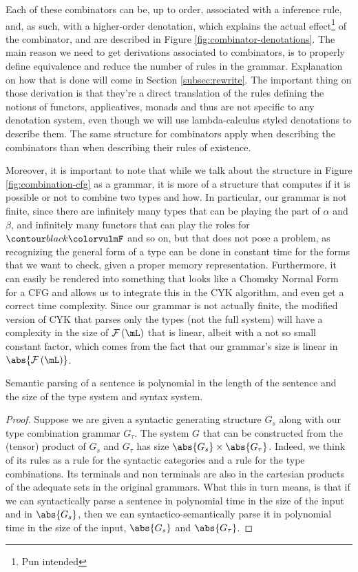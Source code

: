 Each of these combinators can be, up to order, associated with a inference
rule, and, as such, with a higher-order denotation, which explains the actual
effect\footnote{Pun intended} of the combinator, and are described in
Figure \ref{fig:combinator-denotations}.
The main reason we need to get derivations associated to combinators, is to
properly define equivalence and reduce the number of rules in the grammar.
Explanation on how that is done will come in Section \ref{subsec:rewrite}.
The important thing on those derivation is that they're a direct translation
of the rules defining the notions of functors, applicatives, monads and thus
are not specific to any denotation system, even though we will use
lambda-calculus styled denotations to describe them.
The same structure for combinators apply when describing the combinators
than when describing their rules of existence.

\medskip

Moreover, it is important to note that while we talk about the structure in
Figure \ref{fig:combination-cfg} as a grammar, it is more of a structure that
computes if it is possible or not to combine two types and how.
In particular, our grammar is not finite, since there are infinitely many types
that can be playing the part of $\alpha$ and $\beta$, and infinitely many
functors that can play the roles for $\f{F}$ and so on, but that does not pose
a problem, as recognizing the general form of a type can be done in constant
time for the forms that we want to check, given a proper memory representation.
Furthermore, it can easily be rendered into something that looks like a
Chomsky Normal Form for a CFG and allows us to integrate this in the CYK
algorithm, and even get a correct time complexity.
Since our grammar is not actually finite, the modified version of CYK that
parses only the types (not the full system) will have a complexity in the
size of $\mFunc\left(\mL\right)$ that is linear, albeit with a not so
small constant factor, which comes from the fact that our grammar's size is
linear in $\abs{\mFunc\left(\mL\right)}$.

\begin{thm}
	\label{thm:ptime-parse}
	Semantic parsing of a sentence is polynomial in the length of the	sentence
	and the size of the type system and syntax system.
\end{thm}
\begin{proof}
	Suppose we are given a syntactic generating structure $G_{s}$ along with our
	type combination grammar $G_{\tau}$.
	The system $G$ that can be constructed from the (tensor) product of $G_{s}$ and
	$G_{\tau}$ has size $\abs{G_{s}}\times \abs{G_{\tau}}$.
	Indeed, we think of its rules as a rule for the syntactic categories and a rule
	for the type combinations. Its terminals and non terminals are also in the
	cartesian products of the adequate sets in the original grammars.
	What this in turn means, is that if we can syntactically parse a sentence in
	polynomial time in the size of the input and in $\abs{G_{s}}$, then we can
	syntactico-semantically parse it in polynomial time in the size of the input,
	$\abs{G_{s}}$ and $\abs{G_{\tau}}$.
\end{proof}

